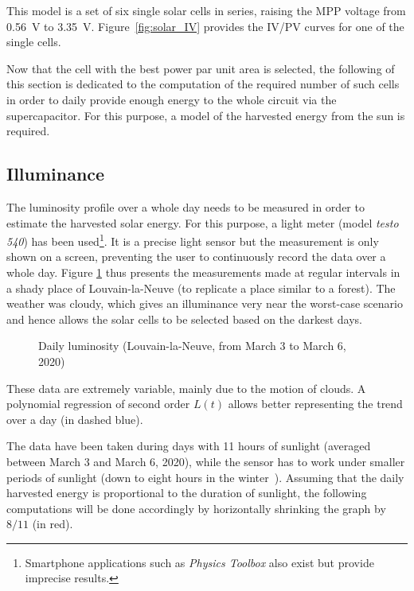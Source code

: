 \documentclass{EPL-master-thesis-covers-EN}
\newcommand{\te}[1]{\textrm{#1}}
\begin{document}
This model is a set of six single solar cells in series, raising the MPP voltage from \SI{0.56}{V} to \SI{3.35}{V}. Figure~\ref{fig:solar_IV} provides the IV/PV curves for one of the single cells.

Now that the cell with the best power par unit area is selected, the following of this section is dedicated to the computation of the required number of such cells in order to daily provide enough energy to the whole circuit via the supercapacitor. For this purpose, a model of the harvested energy from the sun is required.


\subsection*{Illuminance}

The luminosity profile over a whole day needs to be measured in order to estimate the harvested solar energy. For this purpose, a light meter (model \textit{testo 540}) has been used\footnote{Smartphone applications such as \textit{Physics Toolbox} also exist but provide imprecise results.}. It is a precise light sensor but the measurement is only shown on a screen, preventing the user to continuously record the data over a whole day. Figure \ref{fig:daily_luminosity} thus presents the measurements made at regular intervals in a shady place of Louvain-la-Neuve (to replicate a place similar to a forest). The weather was cloudy, which gives an illuminance very near the worst-case scenario and hence allows the solar cells to be selected based on the darkest days.

\begin{figure}[H]
    \centering
    
    \caption{Daily luminosity (Louvain-la-Neuve, from March 3 to March 6, 2020)}
    \label{fig:daily_luminosity}
\end{figure}

These data are extremely variable, mainly due to the motion of clouds. A polynomial regression of second order $L(t)$ allows better representing the trend over a day (in dashed blue).

The data have been taken during days with 11 hours of sunlight (averaged between March 3 and March 6, 2020), while the sensor has to work under smaller periods of sunlight (down to eight hours in the winter~\cite{sunlight}). Assuming that the daily harvested energy is proportional to the duration of sunlight, the following computations will be done accordingly by horizontally shrinking the graph by $8/11$ (in red).
\end{document}
